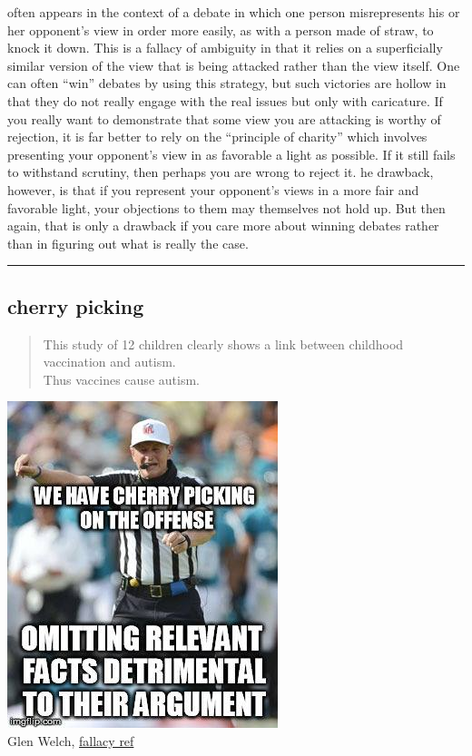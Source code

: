 \documentclass[justified]{tufte-book}
\newenvironment{argument}{\begin{quote}\normalsize}{\end{quote}}
\begin{document}
 often appears in the context of a debate in which one person misrepresents his or her opponent's view in order more easily, as with a person made of straw, to knock it down. This is a fallacy of ambiguity in that it relies on a superficially similar version of the view that is being attacked rather than the view itself. One can often ``win'' debates by using this strategy, but such victories are hollow in that they do not really engage with the real issues but only with caricature. If you really want to demonstrate that some view you are attacking is worthy of rejection, it is far better to rely on the ``principle of charity'' which involves presenting your opponent's view in as favorable a light as possible. If it still fails to withstand scrutiny, then perhaps you are wrong to reject it. he drawback, however, is that if you represent your opponent's views in a more fair and favorable light, your objections to them may themselves not hold up. But then again, that is only a drawback if you care more about winning debates rather than in figuring out what is really the case.

\begin{center}\rule{0.5\linewidth}{\linethickness}\end{center}

\hypertarget{cherry-picking}{%
\subsection*{cherry picking}\label{cherry-picking}}

\begin{argument}
This study of 12 children clearly shows a link between childhood
vaccination and autism.\\
Thus vaccines cause autism.
\end{argument}

\begin{marginfigure}
\includegraphics{img/fallacies/cherry-picking.jpg}\\
Glen Welch, \href{https://twitter.com/fallacy_ref?lang=en}{fallacy ref}
\end{marginfigure}
\end{document}
